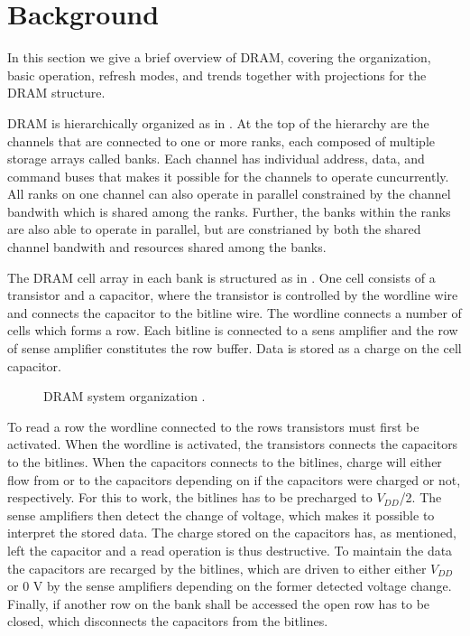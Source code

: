 \section{Background} 
\label{sec:bg}
In this section we give a brief overview of DRAM, covering the organization, basic operation, refresh modes, and trends together with projections for the DRAM structure.

DRAM is hierarchically organized as in . At the top of the hierarchy are the channels that are connected to one or more ranks, each composed of multiple storage arrays called banks. Each channel has individual address, data, and command buses that makes it possible for the channels to operate cuncurrently. All ranks on one channel can also operate in parallel constrained by the channel bandwith which is shared among the ranks. Further, the banks within the ranks are also able to operate in parallel, but are constrianed by both the shared channel bandwith and resources shared among the banks. 

The DRAM cell array in each bank is structured as in . One cell consists of a transistor and a capacitor, where the transistor is controlled by the wordline wire and connects the capacitor to the bitline wire. The wordline connects a number of cells which forms a row. Each bitline is connected to a sens amplifier and the row of sense amplifier constitutes the row buffer. Data is stored as a charge on the cell capacitor.

\begin{figure*}[t]
    \centering
	\caption{DRAM system organization \cite{raidr}.}
	\label{fig:dram_org}
\end{figure*}

To read a row the wordline connected to the rows transistors must first be activated. When the wordline is activated, the transistors connects the capacitors to the bitlines. When the capacitors connects to the bitlines, charge will either flow from or to the capacitors depending on if the capacitors were charged or not, respectively. For this to work, the bitlines has to be precharged to \(V_{DD}\)/2. The sense amplifiers then detect the change of voltage, which makes it possible to interpret the stored data. The charge stored on the capacitors has, as mentioned, left the capacitor and a read operation is thus destructive. To maintain the data the capacitors are recarged by the bitlines, which are driven to either either \(V_{DD}\) or 0 V by the sense amplifiers depending on the former detected voltage change. Finally, if another row on the bank shall be accessed the open row has to be closed, which disconnects the capacitors from the bitlines.

